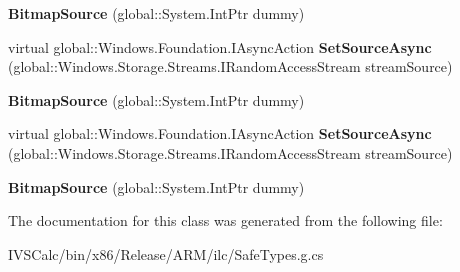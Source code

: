 \begin{DoxyCompactItemize}
{\bfseries Bitmap\+Source} (global\+::\+System.\+Int\+Ptr dummy)
\item 
\mbox{\label{class_windows_1_1_u_i_1_1_xaml_1_1_media_1_1_imaging_1_1_bitmap_source_a818786602156a66e4e78b9865d101d4e}} 
virtual global\+::\+Windows.\+Foundation.\+I\+Async\+Action {\bfseries Set\+Source\+Async} (global\+::\+Windows.\+Storage.\+Streams.\+I\+Random\+Access\+Stream stream\+Source)
\item 
\mbox{\label{class_windows_1_1_u_i_1_1_xaml_1_1_media_1_1_imaging_1_1_bitmap_source_a78daced3d43d96a2659f0a100105fa82}} 
{\bfseries Bitmap\+Source} (global\+::\+System.\+Int\+Ptr dummy)
\item 
\mbox{\label{class_windows_1_1_u_i_1_1_xaml_1_1_media_1_1_imaging_1_1_bitmap_source_a818786602156a66e4e78b9865d101d4e}} 
virtual global\+::\+Windows.\+Foundation.\+I\+Async\+Action {\bfseries Set\+Source\+Async} (global\+::\+Windows.\+Storage.\+Streams.\+I\+Random\+Access\+Stream stream\+Source)
\item 
\mbox{\label{class_windows_1_1_u_i_1_1_xaml_1_1_media_1_1_imaging_1_1_bitmap_source_a78daced3d43d96a2659f0a100105fa82}} 
{\bfseries Bitmap\+Source} (global\+::\+System.\+Int\+Ptr dummy)
\end{DoxyCompactItemize}


The documentation for this class was generated from the following file\+:\begin{DoxyCompactItemize}
\item 
I\+V\+S\+Calc/bin/x86/\+Release/\+A\+R\+M/ilc/Safe\+Types.\+g.\+cs\end{DoxyCompactItemize}
